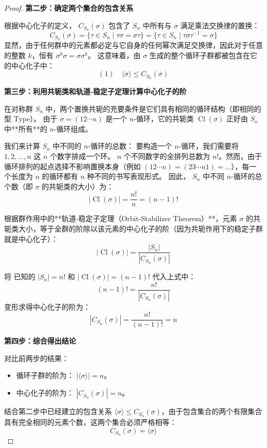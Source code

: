 \documentclass[]{article}
\begin{document}
\begin{proof}
\bigskip
\noindent \textbf{第二步：确定两个集合的包含关系}

根据中心化子的定义， $C_{S_n}(\sigma)$ 包含了 $S_n$ 中所有与 $\sigma$ 满足乘法交换律的置换：
\[ C_{S_n}(\sigma) = \{ \tau \in S_n \mid \tau \sigma = \sigma \tau \} = \{ \tau \in S_n \mid \tau \sigma \tau^{-1} = \sigma \} \]
显然，由于任何群中的元素都必定与它自身的任何幂次满足交换律，因此对于任意的整数 $k$，恒有 $\sigma^k \sigma = \sigma \sigma^k$。
这意味着，由 $\sigma$ 生成的整个循环子群都被包含在它的中心化子中：
\[ (1) \quad \langle\sigma\rangle \leqslant C_{S_n}(\sigma) \]

\bigskip
\noindent \textbf{第三步：利用共轭类和轨道-稳定子定理计算中心化子的阶}

在对称群 $S_n$ 中，两个置换共轭的充要条件是它们具有相同的循环结构（即相同的型 Type）。
由于 $\sigma = (12\cdots n)$ 是一个 $n$-循环，它的共轭类 $\operatorname{Cl}(\sigma)$ 正好由 $S_n$ 中**所有**的 $n$-循环组成。

我们来计算 $S_n$ 中不同的 $n$-循环的总数：
要构造一个 $n$-循环，我们需要将 $1, 2, \dots, n$ 这 $n$ 个数字排成一个环。
$n$ 个不同数字的全排列总数为 $n!$。然而，由于循环排列的起点选择不影响置换本身（例如 $(12\cdots n) = (23\cdots n1) = \dots$），每一个长度为 $n$ 的循环都有 $n$ 种不同的书写表现形式。
因此， $S_n$ 中不同 $n$-循环的总个数（即 $\sigma$ 的共轭类的大小）为：
\[ |\operatorname{Cl}(\sigma)| = \frac{n!}{n} = (n-1)! \]

根据群作用中的**轨道-稳定子定理（Orbit-Stabilizer Theorem）**，元素 $\sigma$ 的共轭类大小，等于全群的阶除以该元素的中心化子的阶（因为共轭作用下的稳定子群就是中心化子）：
\[ |\operatorname{Cl}(\sigma)| = \frac{|S_n|}{|C_{S_n}(\sigma)|} \]

将 已知的 $|S_n| = n!$ 和 $|\operatorname{Cl}(\sigma)| = (n-1)!$ 代入上式中：
\[ (n-1)! = \frac{n!}{|C_{S_n}(\sigma)|} \]
变形求得中心化子的阶为：
\[ |C_{S_n}(\sigma)| = \frac{n!}{(n-1)!} = n \]

\bigskip
\noindent \textbf{第四步：综合得出结论}

对比前两步的结果：
\begin{itemize}
	\item 循环子群的阶为： $|\langle\sigma\rangle| = n$。
	\item 中心化子的阶为： $|C_{S_n}(\sigma)| = n$。
\end{itemize}
结合第二步中已经建立的包含关系 $\langle\sigma\rangle \leqslant C_{S_n}(\sigma)$，由于包含集合的两个有限集合具有完全相同的元素个数，这两个集合必须严格相等：
\[ C_{S_n}(\sigma) = \langle\sigma\rangle \]


\end{proof}
\end{document}
